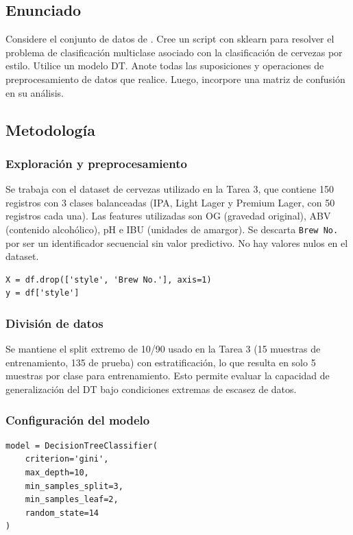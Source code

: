 \documentclass{article}
\begin{document}
\subsection{Enunciado}

Considere el conjunto de datos de \cite{KaggleAnkursBeerData}. Cree un script con sklearn para resolver el problema de clasificación multiclase asociado con la clasificación de cervezas por estilo. Utilice un modelo DT. Anote todas las suposiciones y operaciones de preprocesamiento de datos que realice. Luego, incorpore una matriz de confusión en su análisis.

\subsection{Metodología}

\subsubsection{Exploración y preprocesamiento}

Se trabaja con el dataset de cervezas utilizado en la Tarea 3, que contiene 150 registros con 3 clases balanceadas (IPA, Light Lager y Premium Lager, con 50 registros cada una). Las features utilizadas son OG (gravedad original), ABV (contenido alcohólico), pH e IBU (unidades de amargor). Se descarta \texttt{Brew No.} por ser un identificador secuencial sin valor predictivo. No hay valores nulos en el dataset.

\begin{lstlisting}
X = df.drop(['style', 'Brew No.'], axis=1)
y = df['style']
\end{lstlisting}

\subsubsection{División de datos}

Se mantiene el split extremo de 10/90 usado en la Tarea 3 (15 muestras de entrenamiento, 135 de prueba) con estratificación, lo que resulta en solo 5 muestras por clase para entrenamiento. Esto permite evaluar la capacidad de generalización del DT bajo condiciones extremas de escasez de datos.

\subsubsection{Configuración del modelo}

\begin{lstlisting}
model = DecisionTreeClassifier(
    criterion='gini',
    max_depth=10,
    min_samples_split=3,
    min_samples_leaf=2,
    random_state=14
)
\end{lstlisting}
\end{document}
